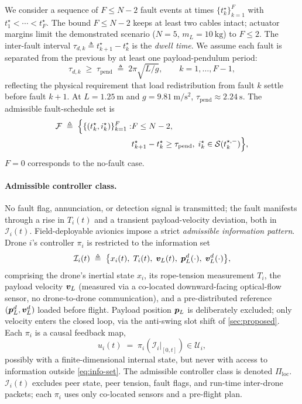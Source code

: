 We consider a sequence of $F \le N-2$ fault events at times $\{t_k^\star\}_{k=1}^F$ with $t_1^\star < \cdots < t_F^\star$. The bound $F \le N-2$ keeps at least two cables intact; actuator margins limit the demonstrated scenario ($N = 5$, $m_L = \SI{10}{\kilo\gram}$) to $F \le 2$. The inter-fault interval $\tau_{d,k} \triangleq t_{k+1}^\star - t_k^\star$ is the \emph{dwell time}. We assume each fault is separated from the previous by at least one payload-pendulum period:
\begin{equation}
  \tau_{d,k} \;\ge\; \tau_{\mathrm{pend}} \;\triangleq\;
    2\pi\sqrt{L/g}, \qquad k = 1, \dots, F-1,
  \label{eq:dwell-assumption}
\end{equation}
reflecting the physical requirement that load redistribution from fault $k$ settle before fault $k+1$. At $L = \SI{1.25}{\metre}$ and $g = \SI{9.81}{\metre\per\second\squared}$, $\tau_{\mathrm{pend}} \approx \SI{2.24}{\second}$. The admissible fault-schedule set is
\begin{align}
\label{eq:fault-schedule-set}
  \mathcal{F} \;\triangleq\;
    \Bigl\{
      \{(t_k^\star, i_k^\star)\}_{k=1}^F :
 &F \le N-2,\;\\
 &t_{k+1}^\star - t_k^\star \ge \tau_{\mathrm{pend}},\;
 i_k^\star \in \mathcal{S}(t_k^{\star,-})
    \Bigr\},\nonumber
\end{align}
$F = 0$ corresponds to the no-fault case.

\paragraph{Admissible controller class.} No fault flag, annunciation, or detection signal is transmitted; the fault manifests through a rise in $T_i(t)$ and a transient payload-velocity deviation, both in $\mathcal{I}_i(t)$. Field-deployable avionics impose a strict \emph{admissible information pattern}. Drone $i$'s controller $\pi_i$ is restricted to the information set
\begin{equation}
  \mathcal{I}_i(t) \;\triangleq\;
    \bigl\{x_i(t),\; T_i(t),\; \boldsymbol{v}_L(t),\;
      \boldsymbol{p}_L^d(\cdot),\; \boldsymbol{v}_L^d(\cdot)\bigr\},
  \label{eq:info-set}
\end{equation}
comprising the drone's inertial state $x_i$, its rope-tension measurement $T_i$, the payload velocity $\boldsymbol{v}_L$ (measured via a co-located downward-facing optical-flow sensor, no drone-to-drone communication), and a pre-distributed reference $({\boldsymbol{p}}_L^d, {\boldsymbol{v}}_L^d)$ loaded before flight. Payload position $\boldsymbol{p}_L$ is deliberately excluded; only velocity enters the closed loop, via the anti-swing slot shift of \cref{sec:proposed}. Each $\pi_i$ is a causal feedback map,
\begin{equation}
 u_i(t) \;=\; \pi_i\!\left(
    \left.\mathcal{I}_i\right|_{[0,t]}
  \right) \in \mathcal{U}_i,
  \label{eq:controller-map}
\end{equation}
possibly with a finite-dimensional internal state, but never with access to information outside \eqref{eq:info-set}. The admissible controller class is denoted $\Pi_{\mathrm{loc}}$. $\mathcal{I}_i(t)$ excludes peer state, peer tension, fault flags, and run-time inter-drone packets; each $\pi_i$ uses only co-located sensors and a pre-flight plan.

